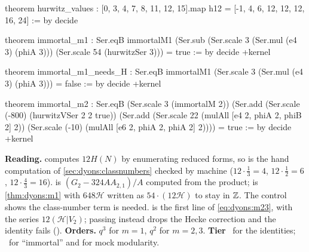 \begin{leanbox}
\begin{leancode}
theorem hurwitz_values :
    [0, 3, 4, 7, 8, 11, 12, 15].map h12 =
      [-1, 4, 6, 12, 12, 12, 16, 24] := by decide

theorem immortal_m1 :
    Ser.eqB immortalM1
      (Ser.sub (Ser.scale 3 (Ser.mul (e4 3) (phiA 3)))
        (Ser.scale 54 (hurwitzSer 3))) = true := by decide +kernel

theorem immortal_m1_needs_H :
    Ser.eqB immortalM1 (Ser.scale 3 (Ser.mul (e4 3) (phiA 3))) = false := by
  decide +kernel

theorem immortal_m2 :
    Ser.eqB (Ser.scale 3 (immortalM 2))
      (Ser.add (Ser.scale (-800) (hurwitzVSer 2 2 true))
        (Ser.add (Ser.scale 22 (mulAll [e4 2, phiA 2, phiB 2] 2))
          (Ser.scale (-10) (mulAll [e6 2, phiA 2, phiA 2] 2)))) = true := by
  decide +kernel
\end{leancode}
\textbf{Reading.}  computes $12H(N)$ by enumerating reduced forms, so
 is the hand computation of \cref{sec:dyons:classnumbers} checked by
machine ($12\cdot\tfrac13=4$, $12\cdot\tfrac12=6$, $12\cdot\tfrac43=16$).
 is $(G_2-324AA_{2,1})/A$ computed from the product;  is
\cref{thm:dyons:m1} with $648\mathcal H$ written as $54\cdot(12\mathcal H)$ to stay in $\mathbb{Z}$.
The control shows the class-number term is needed.  is the first line of
\eqref{eq:dyons:m23}, with  the series $12(\mathcal H|V_2)$;
passing  instead drops the Hecke correction and the identity fails
(). \textbf{Orders.} $q^3$ for $m=1$, $q^2$ for $m=2,3$.
\textbf{Tier} \TA\ for the identities; \TL\ for ``immortal'' and for mock modularity.
\end{leanbox}

